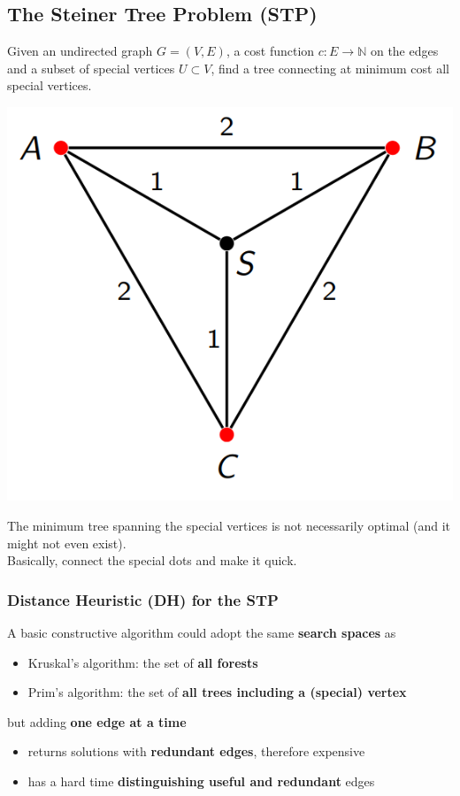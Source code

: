 \newpage

\subsection{The Steiner Tree Problem (STP)}
Given an undirected graph $G = (V , E )$, a cost function $c : E \rightarrow \mathbb{N}$ on the edges and a subset of special vertices $U \subset V$, find a tree connecting at minimum cost all special vertices.
\begin{center}
	\includegraphics[width=0.6\columnwidth]{img/STP1}
\end{center}
The minimum tree spanning the special vertices is not necessarily optimal (and it might not even exist).\\

Basically, connect the special dots and make it quick.\\

\newpage

\subsubsection{Distance Heuristic (DH) for the STP}
A basic constructive algorithm could adopt the same \textbf{search spaces} as
\begin{itemize}
	\item Kruskal's algorithm: the set of \textbf{all forests}
	\item Prim's algorithm: the set of \textbf{all trees including a (special) vertex}
\end{itemize}

but adding \textbf{one edge at a time}
\begin{itemize}
	\item returns solutions with \textbf{redundant edges}, therefore expensive
	\item has a hard time \textbf{distinguishing useful and redundant} edges
\end{itemize}

